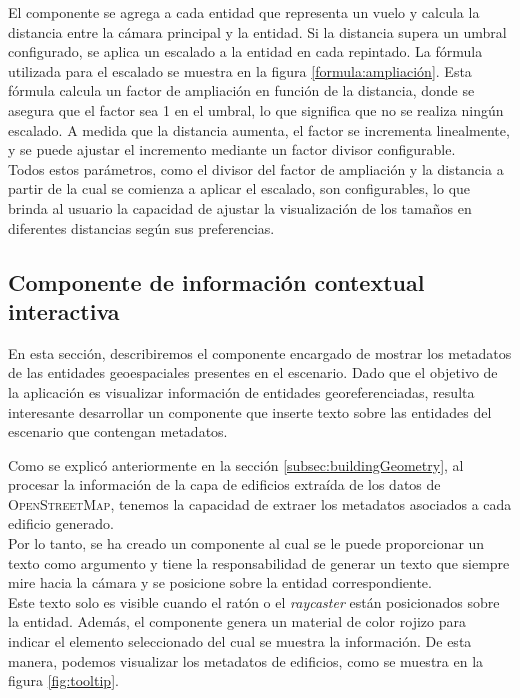 \documentclass[a4paper, 11pt]{book}
\begin{document}
El componente se agrega a cada entidad que representa un vuelo y calcula la distancia entre la cámara principal y la entidad. Si la distancia supera un umbral configurado, se aplica un escalado a la entidad en cada repintado. La fórmula utilizada para el escalado se muestra en la figura \ref{formula:ampliación}. Esta fórmula calcula un factor de ampliación en función de la distancia, donde se asegura que el factor sea 1 en el umbral, lo que significa que no se realiza ningún escalado. A medida que la distancia aumenta, el factor se incrementa linealmente, y se puede ajustar el incremento mediante un factor divisor configurable. \\
Todos estos parámetros, como el divisor del factor de ampliación y la distancia a partir de la cual se comienza a aplicar el escalado, son configurables, lo que brinda al usuario la capacidad de ajustar la visualización de los tamaños en diferentes distancias según sus preferencias.

\subsection{Componente de información contextual interactiva}
\label{subsec:tooltip}
En esta sección, describiremos el componente encargado de mostrar los metadatos de las entidades geoespaciales presentes en el escenario. Dado que el objetivo de la aplicación es visualizar información de entidades georeferenciadas, resulta interesante desarrollar un componente que inserte texto sobre las entidades del escenario que contengan metadatos.

Como se explicó anteriormente en la sección \ref{subsec:buildingGeometry}, al procesar la información de la capa de edificios extraída de los datos de \textsc{OpenStreetMap}, tenemos la capacidad de extraer los metadatos asociados a cada edificio generado. \\
Por lo tanto, se ha creado un componente al cual se le puede proporcionar un texto como argumento y tiene la responsabilidad de generar un texto que siempre mire hacia la cámara y se posicione sobre la entidad correspondiente. \\
Este texto solo es visible cuando el ratón o el \emph{raycaster} están posicionados sobre la entidad. Además, el componente genera un material de color rojizo para indicar el elemento seleccionado del cual se muestra la información. De esta manera, podemos visualizar los metadatos de edificios, como se muestra en la figura \ref{fig:tooltip}.
\end{document}
